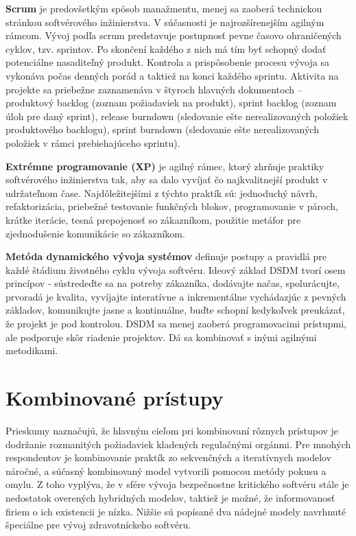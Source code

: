 \documentclass[10pt,twoside,slovak,a4paper]{article}
\begin{document}
\textbf{Scrum} je predovšetkým spôsob manažmentu, menej sa zaoberá technickou stránkou softvérového inžinierstva. V súčasnosti je najrozšírenejším agilným rámcom\cite{agileReport}. Vývoj podľa scrum predstavuje postupnosť pevne časovo ohraničených cyklov, tzv. sprintov. Po skončení každého z nich má tím byť schopný dodať potenciálne nasaditeľný produkt. Kontrola a prispôsobenie procesu vývoja sa vykonáva počas denných porád a taktiež na konci každého sprintu. Aktivita na projekte sa priebežne zaznamenáva v štyroch hlavných dokumentoch – produktový backlog (zoznam požiadaviek na produkt), sprint backlog (zoznam úloh pre daný sprint), release burndown (sledovanie ešte nerealizovaných položiek produktového backlogu), sprint burndown (sledovanie ešte nerealizovaných položiek v rámci prebiehajúceho sprintu)\cite{scrum}.

\textbf{Extrémne programovanie (XP)} je agilný rámec, ktorý zhrňuje praktiky softvérového inžinierstva tak, aby sa dalo vyvíjať čo najkvalitnejší produkt v udržateľnom čase. Najdôležitejšími z týchto praktík sú: jednoduchý návrh, refaktorizácia, priebežné testovanie funkčných blokov, programovanie v pároch, krátke iterácie, tesná prepojenosť so zákazníkom, použitie metáfor pre zjednodušenie komunikácie so zákazníkom\cite{XP}.

\textbf{Metóda dynamického vývoja systémov} definuje postupy a pravidlá pre každé štádium životného cyklu vývoja softvéru. Ideový základ DSDM tvorí osem princípov - sústredeďte sa na potreby zákazníka, dodávajte načas, spolurácujte, prvoradá je kvalita, vyvíjajte interatívne a inkrementálne vychádazjúc z pevných základov, komunikujte jasne a kontinuálne, buďte schopní kedykoľvek preukázať, že projekt je pod kontrolou. DSDM sa menej zaoberá programovacimi prístupmi, ale podporuje skôr riadenie projektov. Dá sa kombinovať s inými agilnými metodikami\cite{dsdm}.

\section{Kombinované prístupy}
Prieskumy naznačujú, že hlavným cieľom pri kombinovaní rôznych prístupov je dodržanie rozmanitých požiadaviek kladených regulačnými orgánmi. Pre mnohých respondentov je kombinovanie praktík zo sekvenčných a iteratívnych modelov náročné, a súčasný kombinovaný model vytvorili pomocou metódy pokusu a omylu\cite{hybridReport}. Z toho vyplýva, že v sfére vývoja bezpečnostne kritického softvéru stále je nedostatok overených hybridných modelov, taktiež je možné, že informovanosť firiem o ich existencii je nízka. Nižšie sú popísané dva nádejné modely navrhnuté špeciálne pre vývoj zdravotníckeho softvéru.
\end{document}
